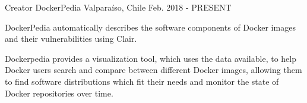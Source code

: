 \begin{cventries}
  \cventry
    {Creator}
    {DockerPedia}
    {Valparaíso, Chile}
    {Feb. 2018 - PRESENT}
    {
      \begin{cvitems}
        \item {DockerPedia automatically describes the software components of Docker images and their vulnerabilities using Clair.}
        \item {Dockerpedia provides a visualization tool, which uses the data available, to help Docker users search and compare between different Docker images, allowing them to find software distributions which fit their needs and monitor the state of Docker repositories over time.}
      \end{cvitems}
    }

\end{cventries}
